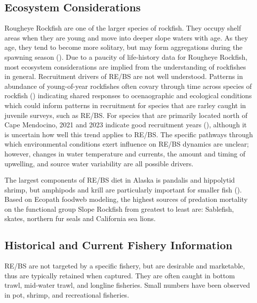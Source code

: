 \documentclass[
]{scrartcl}
\begin{document}
\subsection{Ecosystem Considerations}\label{ecosystem-considerations}

Rougheye Rockfish are one of the larger species of rockfish. They occupy
shelf areas when they are young and move into deeper slope waters with
age. As they age, they tend to become more solitary, but may form
aggregations during the spawning season
(). Due to a paucity of
life-history data for Rougheye Rockfish, most ecosystem considerations
are implied from the understanding of rockfishes in general. Recruitment
drivers of RE/BS are not well understood. Patterns in abundance of
young-of-year rockfishes often covary through time across species of
rockfish () indicating
shared responses to ocenaographic and ecological conditions which could
inform patterns in recruitment for species that are rarley caught in
juvenile surveys, such as RE/BS. For species that are primarily located
north of Cape Mendocino, 2021 and 2023 indicate good recruitment years
(), although it is
uncertain how well this trend applies to RE/BS. The specific pathways
through which environmental conditions exert influence on RE/BS dynamics
are unclear; however, changes in water temperature and currents, the
amount and timing of upwelling, and source water variability are all
possible drivers.

The largest components of RE/BS diet in Alaska is pandalis and
hippolytid shrimp, but amphipods and krill are particularly important
for smaller fish (). Based
on Ecopath foodweb modeling, the highest sources of predation mortality
on the functional group Slope Rockfish from greatest to least are:
Sablefish, skates, northern fur seals and California sea lions.

\subsection{Historical and Current Fishery
Information}\label{historical-and-current-fishery-information}

RE/BS are not targeted by a specific fishery, but are desirable and
marketable, thus are typically retained when captured. They are often
caught in bottom trawl, mid-water trawl, and longline fisheries. Small
numbers have been observed in pot, shrimp, and recreational fisheries.
\end{document}
